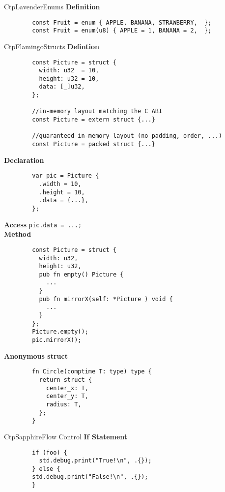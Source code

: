 \documentclass[10pt,a4paper]{article}
\begin{document}
\begin{multicols*}{3}
\begin{mycolorbox}{CtpLavender}{Enums}
	\textbf{Definition}
	\begin{verbatim}
		const Fruit = enum { APPLE, BANANA, STRAWBERRY,  };
		const Fruit = enum(u8) { APPLE = 1, BANANA = 2,  };
	\end{verbatim}
\end{mycolorbox}


\begin{mycolorbox}{CtpFlamingo}{Structs}
	\textbf{Defintion}
	\begin{verbatim}
		const Picture = struct {
		  width: u32  = 10,
		  height: u32 = 10,
		  data: [_]u32,
		};
	
		//in-memory layout matching the C ABI 
		const Picture = extern struct {...}
		
		//guaranteed in-memory layout (no padding, order, ...)
		const Picture = packed struct {...}
	\end{verbatim}

		\textbf{Declaration}
	\begin{verbatim}
		var pic = Picture {
		  .width = 10,
		  .height = 10,
		  .data = {...},
		};
	\end{verbatim}

		\textbf{Access} \texttt {pic.data = {...};} \\
		\textbf{Method}
	\begin{verbatim}
		const Picture = struct {
		  width: u32,
		  height: u32,
		  pub fn empty() Picture {
		    ...
		  }
		  pub fn mirrorX(self: *Picture ) void {
		    ...
		  }
		};
		Picture.empty();
		pic.mirrorX();
	\end{verbatim}

		\textbf{Anonymous struct}
	\begin{verbatim}
		fn Circle(comptime T: type) type {
		  return struct {
		    center_x: T,
		    center_y: T,
		    radius: T,
		  };
		}
	\end{verbatim}
\end{mycolorbox}



\begin{mycolorbox}{CtpSapphire}{Flow Control}
		\textbf{If Statement}
	\begin{verbatim}
		if (foo) {
		  std.debug.print("True!\n", .{});
		} else {
		std.debug.print("False!\n", .{});
		}
	\end{verbatim}


\end{mycolorbox}
\end{multicols*}
\end{document}
